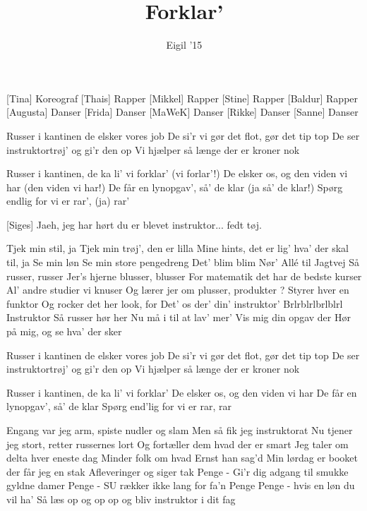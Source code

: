 \documentclass[a4paper,11pt]{article}
\title{Forklar'}
\author{Eigil '15}
\begin{document}
\maketitle

\begin{roles}
[Tina] Koreograf
[Thais] Rapper
[Mikkel] Rapper
[Stine] Rapper
[Baldur] Rapper
[Augusta] Danser
[Frida] Danser
[MaWeK] Danser
[Rikke] Danser
[Sanne] Danser
\end{roles}

\begin{song}
 Russer i kantinen de elsker vores job
De si'r vi gør det flot, gør det tip top
De ser instruktortrøj' og gi'r den op
Vi hjælper så længe der er kroner nok

 Russer i kantinen, de ka li' vi forklar' (vi forlar'!)
De elsker os, og den viden vi har (den viden vi har!)
De får en lynopgav', så' de klar (ja så' de klar!)
Spørg endlig for vi er rar', (ja) rar'

[Siges] Jaeh, jeg har hørt du er blevet instruktor... fedt tøj.

 Tjek min stil, ja
Tjek min trøj', den er lilla
Mine hints, det er lig' hva' der skal til, ja
Se min løn
Se min store pengedreng
Det' blim blim
Nør' Allé til Jagtvej
Så russer, russer
Jer's hjerne blusser, blusser
For matematik det har de bedste kurser
Al' andre studier vi knuser
Og lærer jer om plusser, produkter {?}
Styrer hver en funktor
Og rocker det her look, for
Det' os der' din' instruktor'
Brlrblrlbrlblrl
Instruktor
Så russer hør her
Nu må i til at lav' mer'
Vis mig din opgav der
Hør på mig, og se hva' der sker

 Russer i kantinen de elsker vores job
De si'r vi gør det flot, gør det tip top
De ser instruktortrøj' og gi'r den op
Vi hjælper så længe der er kroner nok

 Russer i kantinen, de ka li' vi forklar'
De elsker os, og den viden vi har
De får en lynopgav', så' de klar
Spørg end'lig for vi er rar, rar

 Engang var jeg arm, spiste nudler og slam
Men så fik jeg instruktorat
Nu tjener jeg stort, retter russernes lort
Og fortæller dem hvad der er smart
Jeg taler om delta hver eneste dag
Minder folk om hvad Ernst han sag'd
Min lørdag er booket der får jeg en stak
Afleveringer og siger tak
Penge - Gi'r dig adgang til smukke gyldne damer
Penge - SU rækker ikke lang for fa'n
Penge Penge - hvis en løn du vil ha'
Så læs op og op op og bliv instruktor i dit fag


\end{song}
\end{document}
